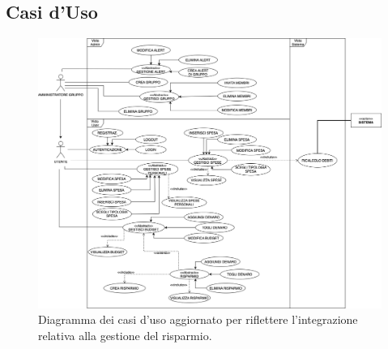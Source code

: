 \subsection{Casi d'Uso}

    \begin{figure}[h]
        \centering
        \includegraphics[scale=0.3]{images/DiagrammaCasiDusoV2.1.png}
        \caption{Diagramma dei casi d'uso aggiornato per riflettere l'integrazione relativa alla gestione del risparmio.}
    \end{figure}
